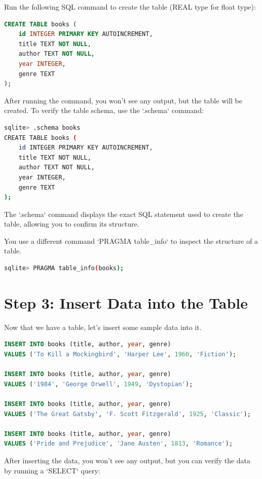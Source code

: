 \documentclass{article}
\begin{document}
Run the following SQL command to create the table (REAL type for float type):

\begin{lstlisting}[language=SQL]
CREATE TABLE books (
    id INTEGER PRIMARY KEY AUTOINCREMENT,
    title TEXT NOT NULL,
    author TEXT NOT NULL,
    year INTEGER,
    genre TEXT
);
\end{lstlisting}

After running the command, you won't see any output, but the table will be created. To verify the table schema, use the `.schema` command:

\begin{lstlisting}[language=bash]
sqlite> .schema books
CREATE TABLE books (
    id INTEGER PRIMARY KEY AUTOINCREMENT,
    title TEXT NOT NULL,
    author TEXT NOT NULL,
    year INTEGER,
    genre TEXT
);
\end{lstlisting}

The `.schema` command displays the exact SQL statement used to create the table, allowing you to confirm its structure.

You use a different command `PRAGMA table\_info` to inspect the structure of a table.
\begin{lstlisting}[language=bash]
sqlite> PRAGMA table_info(books);

\end{lstlisting}

\section*{Step 3: Insert Data into the Table}

Now that we have a table, let's insert some sample data into it.

\begin{lstlisting}[language=SQL]
INSERT INTO books (title, author, year, genre) 
VALUES ('To Kill a Mockingbird', 'Harper Lee', 1960, 'Fiction');

INSERT INTO books (title, author, year, genre) 
VALUES ('1984', 'George Orwell', 1949, 'Dystopian');

INSERT INTO books (title, author, year, genre) 
VALUES ('The Great Gatsby', 'F. Scott Fitzgerald', 1925, 'Classic');

INSERT INTO books (title, author, year, genre) 
VALUES ('Pride and Prejudice', 'Jane Austen', 1813, 'Romance');
\end{lstlisting}

After inserting the data, you won't see any output, but you can verify the data by running a `SELECT` query:
\end{document}
